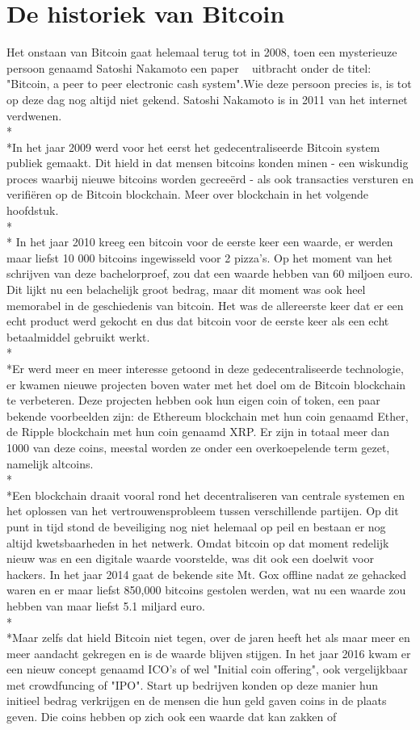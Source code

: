 \documentclass[fleqn,a4paper,12pt]{book}
\begin{document}
\section{De historiek van Bitcoin}
Het onstaan van Bitcoin gaat helemaal terug tot in 2008, toen een mysterieuze persoon genaamd Satoshi Nakamoto een paper ~\autocite{bit1} uitbracht onder de titel: "Bitcoin, a peer to peer electronic cash system".Wie deze persoon precies is, is tot op deze dag nog altijd niet gekend. Satoshi Nakamoto is in 2011 van het internet verdwenen.\\*\\*In het jaar 2009 werd voor het eerst het gedecentraliseerde Bitcoin system publiek gemaakt. Dit hield in dat mensen bitcoins konden minen - een wiskundig proces waarbij nieuwe bitcoins worden gecreeërd - als ook transacties versturen en verifiëren op de Bitcoin blockchain. Meer over blockchain in het volgende hoofdstuk.\\*\\* In het jaar 2010 kreeg een bitcoin voor de eerste keer een waarde, er werden maar liefst 10 000 bitcoins ingewisseld voor 2 pizza's. Op het moment van het schrijven van deze bachelorproef, zou dat een waarde hebben van 60 miljoen euro. Dit lijkt nu een belachelijk groot bedrag, maar dit moment was ook heel memorabel in de geschiedenis van bitcoin. Het was de allereerste keer dat er een echt product werd gekocht en dus dat bitcoin voor de eerste keer als een echt betaalmiddel gebruikt werkt. \\*\\*Er werd meer en meer interesse getoond in deze gedecentraliseerde technologie, er kwamen nieuwe projecten boven water met het doel om de Bitcoin blockchain te verbeteren. Deze projecten hebben ook hun eigen coin of token, een paar bekende voorbeelden zijn: de Ethereum blockchain met hun coin genaamd Ether, de Ripple blockchain met hun coin genaamd XRP. Er zijn in totaal meer dan 1000 van deze coins, meestal worden ze onder een overkoepelende term gezet, namelijk altcoins.\\*\\*Een blockchain draait vooral rond het decentraliseren van centrale systemen en het oplossen van het vertrouwensprobleem tussen verschillende partijen. Op dit punt in tijd stond de beveiliging nog niet helemaal op peil en bestaan er nog altijd kwetsbaarheden in het netwerk. Omdat bitcoin op dat moment redelijk nieuw was en een digitale waarde voorstelde, was dit ook een doelwit voor hackers. In het jaar 2014 gaat de bekende site Mt. Gox offline nadat ze gehacked waren en er maar liefst 850,000 bitcoins gestolen werden, wat nu een waarde zou hebben van maar liefst 5.1 miljard euro.\\*\\*Maar zelfs dat hield Bitcoin niet tegen, over de jaren heeft het als maar meer en meer aandacht gekregen en is de waarde blijven stijgen. In het jaar 2016 kwam er een nieuw concept genaamd ICO's of wel "Initial coin offering", ook vergelijkbaar met crowdfuncing of "IPO". Start up bedrijven konden op deze manier hun initieel bedrag verkrijgen en de mensen die hun geld gaven coins in de plaats geven. Die coins hebben op zich ook een waarde dat kan zakken of 
\end{document}
